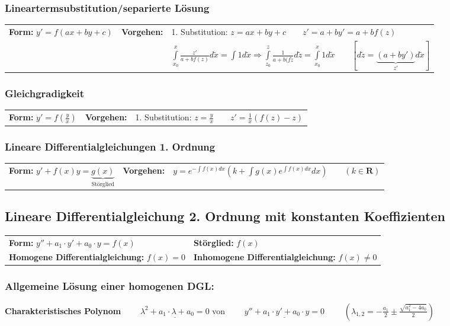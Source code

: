 \subsubsection{Lineartermsubstitution/separierte Lösung}
\begin{tabular}{p{4cm}p{1.5cm}p{10.5cm}}
\textbf{Form:} $y'=f(ax+by+c)$   &
\textbf{Vorgehen:}               &
1. Substitution: $z=ax+by+c \qquad z'=a+by' =a+bf(z)$\\ &&
$\int\limits_{x_0}^{x}\frac{z'}{a+bf(z)}d\tilde{x} = \int 1 d\tilde{x} \Rightarrow \int\limits_{z_0}^{z}\frac{1}{a+b(f\tilde{z}}d\tilde{z} = \int\limits_{x_0}^{x}1 d\tilde{x} \qquad [d\tilde{z} = \underbrace{(a+by')}_{z'} d\tilde{x}]$
\end{tabular}

\subsubsection{Gleichgradigkeit}
\begin{tabular}{p{4cm}p{1.5cm}p{10.5cm}}
\textbf{Form:} $y'=f(\frac{y}{x})$ &
\textbf{Vorgehen:}                &
1. Substitution: $z=\frac{y}{x} \qquad
z'=\frac{1}{x}(f(z)-z)$
\end{tabular}

\subsubsection{Lineare Differentialgleichungen 1. Ordnung }
\begin{tabular}{p{4.5cm}p{1.5cm}p{10.5cm}}
\textbf{Form:} $ y'+f(x)y = \underbrace{g(x)}_{\text{Störglied}} $ &
\textbf{Vorgehen:}                 &
$ y=e^{-\int f(x) dx}(k+\int g(x)e^{\int f(x)dx}dx) \qquad (k\in\mathbf{R})$
\end{tabular}

\subsection{Lineare Differentialgleichung 2. Ordnung mit konstanten 
Koeffizienten }
\begin{tabular}{p{8cm}p{8cm}}
\textbf{Form:} $y''+a_1\cdot y'+a_0\cdot y=f(x)$  &
\textbf{Störglied:} $f(x)$\\
\textbf{Homogene Differentialgleichung:} $f(x)=0$ &
\textbf{Inhomogene Differentialgleichung:} $f(x)\neq 0$
\end{tabular}

\subsubsection{Allgemeine Lösung einer homogenen DGL:\quad{}}
\textbf{Charakteristisches Polynom}
$\qquad\underline{\lambda^2+a_1\cdot\lambda+a_0=0}$ \hspace{1cm}von
$\qquad\underline{y''+a_1\cdot y'+a_0\cdot y=0}$ 
$\qquad(\lambda_{1,2} = -\frac{a_1}{2} \pm \frac{\sqrt{a_1^2 - 4a_0}}{2})$\\ \\

